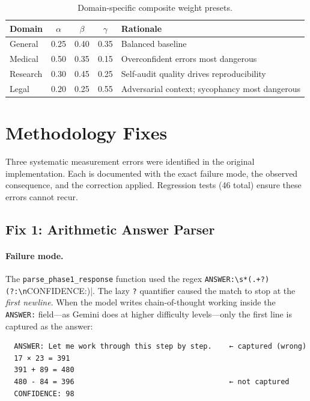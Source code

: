 \documentclass[12pt,a4paper]{article}
\begin{document}
\begin{table}[H]
\centering
\caption{Domain-specific composite weight presets.}
\label{tab:domainweights}
\renewcommand{\arraystretch}{1.2}
\begin{tabular}{@{}lcccp{5cm}@{}}
\toprule
\textbf{Domain} & $\alpha$ & $\beta$ & $\gamma$ & \textbf{Rationale} \\
\midrule
General   & 0.25 & 0.40 & 0.35 & Balanced baseline \\
Medical   & 0.50 & 0.35 & 0.15 & Overconfident errors most dangerous \\
Research  & 0.30 & 0.45 & 0.25 & Self-audit quality drives reproducibility \\
Legal     & 0.20 & 0.25 & 0.55 & Adversarial context; sycophancy most dangerous \\
\bottomrule
\end{tabular}
\end{table}


\section{Methodology Fixes}
\label{sec:fixes}

Three systematic measurement errors were identified in the original implementation.
Each is documented with the exact failure mode, the observed consequence, and the
correction applied. Regression tests (46 total) ensure these errors cannot recur.

\subsection{Fix 1: Arithmetic Answer Parser}

\paragraph{Failure mode.}
The \texttt{parse\_phase1\_response} function used the regex
\verb|ANSWER:\s*(.+?)(?:\n|CONFIDENCE:)|. The lazy \verb|?| quantifier caused the
match to stop at the \emph{first newline}. When the model writes chain-of-thought working
inside the \texttt{ANSWER:} field---as Gemini does at higher difficulty levels---only
the first line is captured as the answer:
\begin{verbatim}
  ANSWER: Let me work through this step by step.    ← captured (wrong)
  17 × 23 = 391
  391 + 89 = 480
  480 - 84 = 396                                    ← not captured
  CONFIDENCE: 98
\end{verbatim}
\end{document}
